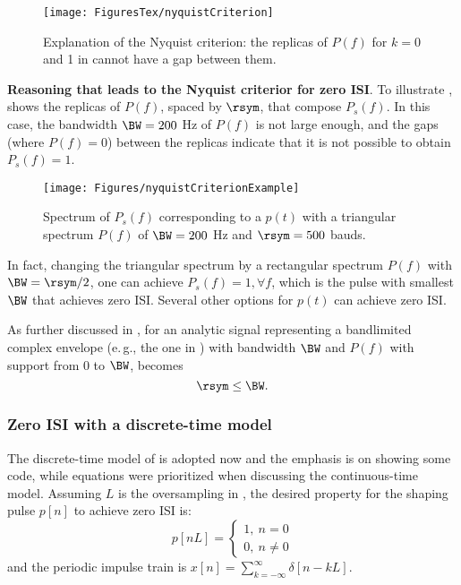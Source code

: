 \begin{figure}[htbp]
\centering
\texttt{[image: FiguresTex/nyquistCriterion]}
\caption{Explanation of the Nyquist criterion: the replicas of $P(f)$ for $k=0$ and 1 in  cannot have a gap between them.\label{fig:nyquistCriterion}}
\end{figure}

\bExample \textbf{Reasoning that leads to the Nyquist criterior for zero ISI}.
To illustrate , 
 shows the replicas of $P(f)$, spaced by $\rsym$, that compose $P_s(f)$. In this case, the bandwidth $\BW=200$ Hz of $P(f)$ is not large enough, and the gaps (where $P(f)=0$) between the replicas indicate that it is not possible to obtain $P_s(f) = 1$. 
\begin{figure}[htbp]
\centering
\texttt{[image: Figures/nyquistCriterionExample]}
\caption{Spectrum of $P_s(f)$ corresponding to a $p(t)$ with a triangular spectrum $P(f)$ of $\BW=200$ Hz and $\rsym=500$ bauds.\label{fig:nyquistCriterionExample}}
\end{figure}
In fact, changing the triangular spectrum by a rectangular spectrum $P(f)$ with $\BW = \rsym/2$, one can achieve $P_s(f)=1, \forall f$, which is the pulse with smallest $\BW$ that achieves zero ISI. Several other options for $p(t)$ can achieve zero ISI. \eExample

As further discussed in , for an analytic signal representing a
bandlimited complex envelope (e.\,g., the one in ) with
bandwidth $\BW$ and $P(f)$ with support from $0$ to $\BW$,  becomes
\begin{equation}
\rsym \le \BW.
\label{eq:nyquistZeroISIComplexEnvelope}
\end{equation}

\subsubsection{Zero ISI with a discrete-time model}

The discrete-time model of  is adopted now and the emphasis is on showing some code, while equations were prioritized when discussing the continuous-time model. Assuming $L$ is the oversampling in , the desired property for the shaping pulse $p[n]$ to achieve zero ISI is:
\[
p[n L] = \left\{ \begin{array}{l} 1,~n = 0 \\ 0,~n \ne 0 \end{array} \right.
\]
and the periodic impulse train is $x[n]=\sum_{k=-\infty}^{\infty} \delta[n-k L]$. 


